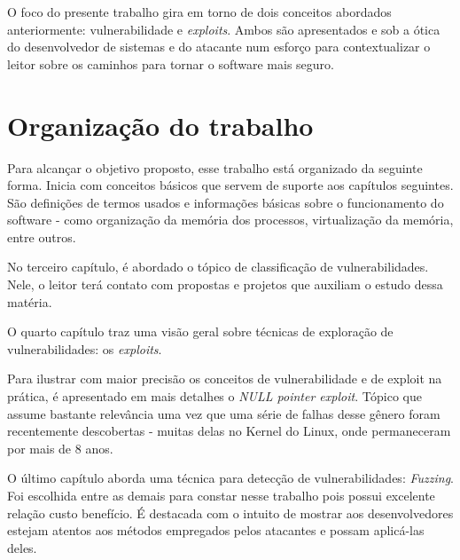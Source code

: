 	
	O foco do presente trabalho gira em torno de dois conceitos abordados anteriormente:
	vulnerabilidade e \textsl{exploits}. Ambos são apresentados e sob a ótica
	do desenvolvedor de sistemas e do atacante num esforço para contextualizar o leitor
	sobre os caminhos para tornar o software mais seguro.
	
	
	\section{Organização do trabalho}
		Para alcançar o objetivo proposto, esse trabalho está organizado da seguinte forma.
		Inicia com conceitos básicos que servem de suporte aos capítulos seguintes. São
		definições de termos usados e informações básicas sobre o funcionamento do software - como
		organização da memória dos processos, virtualização da memória, entre outros.

		No terceiro capítulo, é abordado o tópico de classificação de vulnerabilidades.
		Nele, o leitor terá contato com propostas e projetos que auxiliam o estudo dessa matéria.


		O quarto capítulo traz uma visão geral sobre técnicas de exploração de vulnerabilidades: os
		\textsl{exploits}.


		Para ilustrar com maior precisão os conceitos de vulnerabilidade e de exploit na prática,
		é apresentado em mais detalhes o \textsl{NULL pointer exploit}. Tópico que assume
		bastante relevância uma vez que uma série de falhas desse gênero foram recentemente
		descobertas - muitas delas no Kernel do Linux, onde permaneceram por mais de 8 anos.


		O último capítulo aborda uma técnica para detecção de vulnerabilidades: \textsl{Fuzzing}.
		Foi escolhida entre as demais para constar nesse trabalho pois possui excelente relação
		custo benefício. É destacada com o intuito de mostrar aos desenvolvedores estejam
		atentos aos métodos empregados pelos atacantes e possam aplicá-las deles.
		
		

		

		

